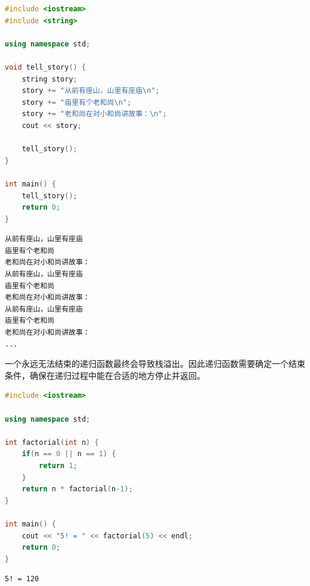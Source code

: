 \vspace{0.5cm}


\begin{lstlisting}[language=C++]
#include <iostream>
#include <string>

using namespace std;

void tell_story() {
	string story;
	story += "从前有座山，山里有座庙\n";
	story += "庙里有个老和尚\n";
	story += "老和尚在对小和尚讲故事：\n";
	cout << story;

	tell_story();
}

int main() {
	tell_story();
	return 0;
}
\end{lstlisting}

\begin{tcolorbox}
	\begin{verbatim}
从前有座山，山里有座庙
庙里有个老和尚
老和尚在对小和尚讲故事：
从前有座山，山里有座庙
庙里有个老和尚
老和尚在对小和尚讲故事：
从前有座山，山里有座庙
庙里有个老和尚
老和尚在对小和尚讲故事：
...
	\end{verbatim}
\end{tcolorbox}

一个永远无法结束的递归函数最终会导致栈溢出。因此递归函数需要确定一个结束条件，确保在递归过程中能在合适的地方停止并返回。\\


\begin{lstlisting}[language=C++]
#include <iostream>

using namespace std;

int factorial(int n) {
	if(n == 0 || n == 1) {
		return 1;
	}
	return n * factorial(n-1);
}

int main() {
	cout << "5! = " << factorial(5) << endl;
	return 0;
}
\end{lstlisting}

\begin{tcolorbox}
	\begin{verbatim}
5! = 120
	\end{verbatim}
\end{tcolorbox}


